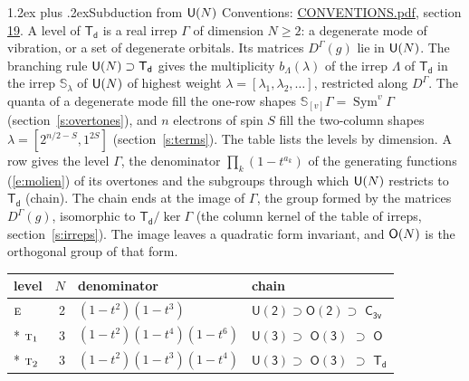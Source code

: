 \documentclass[10pt,a4paper]{article}
\makeatletter
\renewcommand\section{\@startsection{section}{1}{\z@}{-3ex plus -1ex minus -.2ex}%
  {1.2ex plus .2ex}{\normalfont\large\sffamily\bfseries\color{parttitle}}}
\def\grouprule#1#2{\noalign{\marks\LTgroupmarks{\the\belowrulesep}\nobreak\vskip#1%
  \vskip\aboverulesep}\multispan\LT@cols\unskip{\leaders\hrule\@height#2\hfill\kern\z@}\cr
  \noalign{\penalty\LTrulebreak\vskip\belowrulesep\global\@lastruleclass\z@}}
\numberwithin{equation}{section}
\newcommand{\grp}[1]{\mathsf{#1}}
\newcommand{\irr}[1]{\text{\normalfont\scshape #1}}
\newcommand{\repD}[1]{D^{#1}}
\newcommand{\schur}[1]{\mathbb{S}_{#1}}
\newcommand{\shape}[1]{[#1]}
\makeatother
\begin{document}
\section{Subduction from \texorpdfstring{$\grp{U(\mathnormal{N})}$}{U(N)}}\label{s:unitary}
Conventions: \href{../../CONVENTIONS.pdf}{CONVENTIONS.pdf}, section \href{../../CONVENTIONS.pdf\#conv.19}{19}.
\leavevmode\label{n:local.level.dimension}A level of $\grp{T_{d}}$ is a real irrep $\Gamma$ of dimension $N \ge 2$: a degenerate mode of vibration, or a set of degenerate orbitals. \label{n:group.unitary}Its matrices $\repD{\Gamma}(g)$ lie in $\grp{U(\mathnormal{N})}$. \label{n:irrep.schur}\label{n:shape.partition}\label{n:local.partition}\label{n:function.multiplicity.unitary}The branching rule $\grp{U(\mathnormal{N})} \supset \grp{T_{d}}$ gives the multiplicity $b_\Lambda(\lambda)$ of the irrep $\Lambda$ of $\grp{T_{d}}$ in the irrep $\schur{\lambda}$ of $\grp{U(\mathnormal{N})}$ of highest weight $\lambda = \shape{\lambda_1, \lambda_2, \dots}$, restricted along $\repD{\Gamma}$. \label{n:local.partition.power}\label{n:local.electrons}\label{n:local.spin}The quanta of a degenerate mode fill the one-row shapes $\schur{\shape{v}}\Gamma = \operatorname{Sym}^{v}\Gamma$ (section~\ref{s:overtones}), and $n$ electrons of spin $S$ fill the two-column shapes $\lambda = \shape{2^{n/2-S}, 1^{2S}}$ (section~\ref{s:terms}).
The table lists the levels by dimension. \label{n:head.level}\label{n:head.denominator}\label{n:index.overtone.denominator}\label{n:head.chain}A row gives the level $\Gamma$, the denominator $\prod_k (1 - t^{a_k})$ of the generating functions (\ref{e:molien}) of its overtones and the subgroups through which $\grp{U(\mathnormal{N})}$ restricts to $\grp{T_{d}}$ (chain). The chain ends at the image of $\Gamma$, the group formed by the matrices $\repD{\Gamma}(g)$, isomorphic to $\grp{T_{d}}/\ker\Gamma$ (the column kernel of the table of irreps, section~\ref{s:irreps}). The image leaves a quadratic form invariant, and $\grp{O(\mathnormal{N})}$ is the orthogonal group of that form.
{\small\begin{longtable}{@{}lrll@{}}\toprule
level & $N$ & denominator & chain\\\midrule\endhead
\bottomrule\endfoot\endlastfoot
$\irr{e}$ & 2 & $(1-t^{2})(1-t^{3})$ & $\grp{U(2)} \supset \grp{O(2)} \supset$ \href{C3v.pdf}{$\grp{C_{3v}}$}\\*
\grouprule{0pt}{\lightrulewidth}
$\irr{t}_{1}$ & 3 & $(1-t^{2})(1-t^{4})(1-t^{6})$ & $\grp{U(3)} \supset$ \href{O3.pdf}{$\grp{O(3)}$} $\supset$ \href{O.pdf}{$\grp{O}$}\\*
$\irr{t}_{2}$ & 3 & $(1-t^{2})(1-t^{3})(1-t^{4})$ & $\grp{U(3)} \supset$ \href{O3.pdf}{$\grp{O(3)}$} $\supset$ \href{Td.pdf}{$\grp{T_{d}}$}\\
\bottomrule\end{longtable}}
\end{document}

